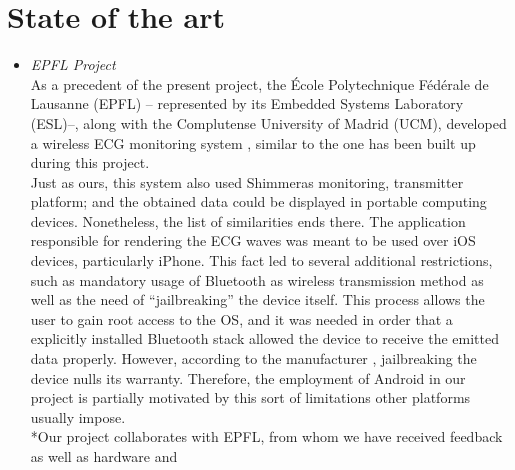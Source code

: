 	\section{State of the art}
		\begin{itemize}


			\item \emph{EPFL Project}\\
				As a precedent of the present project, the École Polytechnique Fédérale de Lausanne (EPFL) --
				represented by its Embedded Systems Laboratory (ESL)--, along with the Complutense University 
				of Madrid (UCM), developed a wireless ECG monitoring system \cite{ESL}, similar to the one has been built 
				up during this project.\\
				Just as ours, this system also used Shimmer\texttrademark as monitoring, transmitter platform;
				and the obtained data could be displayed in portable computing devices.
				Nonetheless, the list of similarities ends there. The application responsible for rendering
				the ECG waves was meant to be used over iOS devices, particularly iPhone. This fact led to several
				additional restrictions, such as mandatory usage of Bluetooth as wireless transmission method as
				well as the need of ``jailbreaking'' the device itself. This process allows the user to gain root access to
				the OS, and it was needed in order that a explicitly installed Bluetooth stack allowed the device to 
				receive the emitted data properly. However, according to the manufacturer \cite{AppleJB}, jailbreaking 
				the device nulls its warranty. Therefore, the employment of Android in our project is partially motivated 
				by this sort of limitations other platforms usually impose.\\
				*Our project collaborates with EPFL, from whom we have received feedback as well as hardware and %

\end{itemize}
